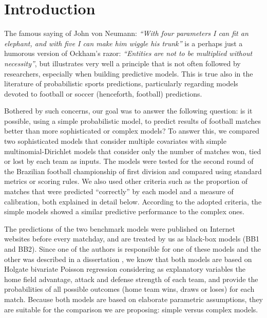 \documentclass[journal,article,accept,moreauthors,pdftex,12pt,a4paper]{mdpi}
\begin{document}

    \section{Introduction}

    The famous saying of John von Neumann: {\it ``With four parameters I can fit an elephant, and with five I can make him wiggle his trunk''} is a perhaps just a humorous version of Ockham's razor:
    {\it``Entities are not to be multiplied without necessity''}, but illustrates very well a principle that is not often followed by researchers, especially when building predictive models.
    This is true also in the literature of probabilistic sports predictions, particularly regarding models devoted to football or soccer {\color{red}(henceforth, football)} predictions.

    Bothered by such concerns, our goal was to answer the following question: is it possible, using a simple probabilistic model, to predict results of football matches better than more sophisticated or complex models?
    To answer this, we compared two sophisticated models that consider multiple covariates with simple multinomial-Dirichlet models that consider only the number of matches won, tied or lost by each team as inputs.
    The models were tested for the second round of the Brazilian football championship of first division and compared using standard metrics or scoring rules.
    We also used other criteria such as the proportion of matches that were predicted ``correctly'' by each model and a measure of calibration, both explained in detail below.
    According to the adopted criteria, the simple models showed a similar predictive performance to the complex ones.

    The predictions of the two benchmark models were published on Internet websites before every matchday, and are treated by us as black-box models (BB1 and BB2).
    {\color{red} Since one of the authors is responsible for one of these models and the other was described in a dissertation \citep{arruda2000}}, we know that both models are based on Holgate bivariate Poisson regression considering as explanatory variables the home field advantage, attack and defense strength of each team, and provide the probabilities of all possible outcomes (home team wins, draws or loses) for each match.
    Because both models are based on elaborate parametric assumptions, they are suitable for the comparison we are proposing: simple versus complex models. 
\end{document}
